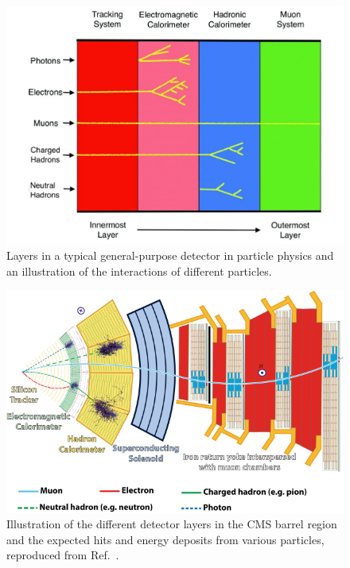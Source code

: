 \begin{figure}[ht]
    \centering
    \includegraphics[width=\textwidth]{figures/02-CMS/cms/interactions_layers_edit2.pdf}
    \caption{Layers in a typical general-purpose detector in particle physics and an illustration of the interactions of different particles.}
    \label{fig:02_cms_layers}
\end{figure}

\begin{figure}[ht!]
    \centering
    \includegraphics[width=\textwidth]{figures/02-CMS/cms/components/slice.png}
    \caption{Illustration of the different detector layers in the CMS barrel region and the expected hits and energy deposits from various particles, reproduced from Ref.~\cite{Davis:2205172}.}
    \label{fig:02_cms_slice}
\end{figure}

